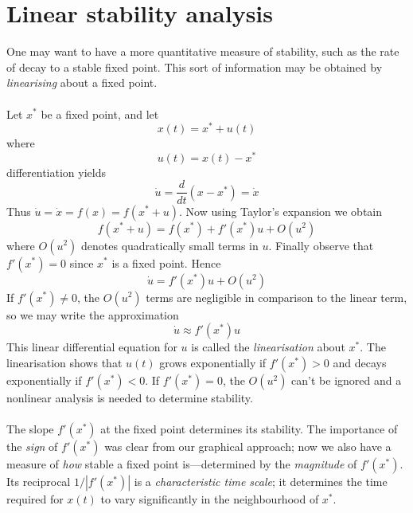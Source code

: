 \documentclass{report}
\theoremstyle{definition}
\begin{document}
\section{Linear stability analysis}
One may want to have a more quantitative measure of stability, such as the rate of decay to a stable fixed point. This sort of information
may be obtained by \textit{linearising} about a fixed point.\\
\vspace{1mm}\\
Let $x^*$ be a fixed point, and let
\begin{equation*}
x(t)=x^*+u(t)
\end{equation*}
where 
\begin{equation*}
u(t)=x(t)-x^*
\end{equation*}
differentiation yields
\begin{equation*}
\dot u=\frac{d}{dt}(x-x^*)=\dot x
\end{equation*}
Thus $\dot u=\dot x=f(x)=f(x^*+u)$. Now using Taylor's expansion we obtain
\begin{equation*}
f(x^*+u)=f(x^*)+f'(x^*)u+O(u^2)
\end{equation*}
where $O(u^2)$ denotes quadratically small terms in $u$. Finally observe that $f'(x^*)=0$ since $x^*$ is a fixed point. Hence
\begin{equation*}
\dot u=f'(x^*)u+O(u^2)
\end{equation*}
If $f'(x^*)\neq0$, the $O(u^2)$ terms are negligible in comparison to the linear term, so we may write the approximation
\begin{equation*}
\dot u\approx f'(x^*)u
\end{equation*}
This linear differential equation for $u$ is called the \textit{linearisation} about $x^*$. The linearisation shows that $u(t)$ grows exponentially if $f'(x^*)>0$ and decays exponentially if 
$f'(x^*)<0$. If $f'(x^*)=0$, the $O(u^2)$ can't be ignored and a nonlinear analysis is needed to determine stability.\\
\vspace{1mm}\\
The slope $f'(x^*)$ at the fixed point determines its stability. The importance of the \textit{sign} of $f'(x^*)$ was clear from our graphical approach; now we also
have a measure of \textit{how} stable a fixed point is---determined by the \textit{magnitude} of $f'(x^*)$. Its reciprocal $1/|f'(x^*)|$ is a \textit{characteristic time scale}; it determines the 
time required for $x(t)$ to vary significantly in the neighbourhood of $x^*$.
\newpage
\end{document}
